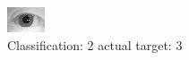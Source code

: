 \begin{figure}[h!]
\begin{center}
\includegraphics[width=0.60\columnwidth]{figures/ID1061_class_2_target_3.png}
\end{center}
\caption{ Classification: 2 actual target: 3}
\label{fig:ID1061_class_2_target_3}
\end{figure}
